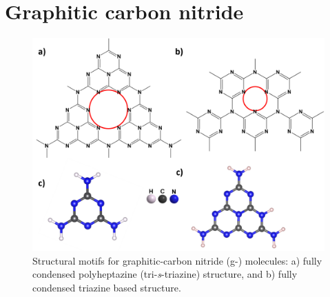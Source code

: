 \section{Graphitic carbon nitride}
\begin{figure}[th!]
\centering
\includegraphics[width=\textwidth]{Figures/chap6fig/c3n4}
\caption{Structural motifs for graphitic-carbon nitride (g-) molecules: a) fully condensed polyheptazine (tri-\textit{s}-triazine)  structure, and b) fully condensed triazine based  structure.}
\label{Figures/chap6fig:c3n4}
\end{figure}
